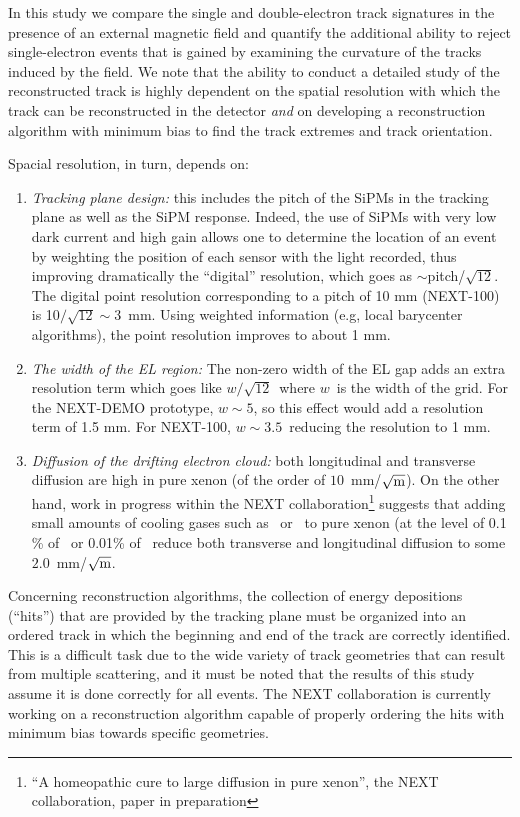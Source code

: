 \documentclass{JINST}
\begin{document}
In this study we compare the single and double-electron track signatures in the presence of an external magnetic field and quantify the additional ability to reject single-electron events that is gained by examining the curvature of the tracks induced by the field.  We note that the ability to conduct a detailed study of the reconstructed track is highly dependent on the spatial resolution with which the track can be reconstructed in the detector {\em and} on developing a reconstruction algorithm with minimum bias to find the track extremes and track orientation. 

Spacial resolution, in turn, depends on:
\begin{enumerate}
\item {\em Tracking plane design:} this includes the pitch of the SiPMs in the tracking plane as well as the SiPM response. Indeed, the use of SiPMs with very low dark current and high gain allows one to determine the location of an event by weighting the position of each sensor with the light recorded, thus improving dramatically the ``digital'' resolution, which goes as $\sim$pitch/$\sqrt{12}$. The digital point resolution corresponding to a pitch of 10 mm (NEXT-100) is 10$/\sqrt{12} \sim 3$~mm. Using weighted information (e.g, local barycenter algorithms), the point resolution improves to about 1 mm. 
\item {\em The width of the EL region:}
The non-zero width of the EL gap adds an extra resolution term which goes like $w/\sqrt{12}$~where $w$~is the width of the grid. For the NEXT-DEMO prototype, $w\sim 5$, so this effect would add a resolution term of 1.5 mm. For NEXT-100, $w\sim 3.5$~reducing the resolution to 1 mm. 

\item {\em Diffusion of the drifting electron cloud:}  both longitudinal and transverse diffusion are high in pure xenon (of the order of $10$~mm/$\sqrt{\rm{m}}$). On the other hand, work in progress within the NEXT collaboration\footnote{``A homeopathic cure to large diffusion in pure xenon'', the NEXT collaboration, paper in preparation} suggests that adding small amounts of cooling gases such as \CHF\ or \CFF\ to pure xenon (at the level of 0.1 \% of \CHF\ or 0.01\% of \CFF\ reduce both transverse and longitudinal diffusion to some $2.0$~mm/$\sqrt{\rm{m}}$.
\end{enumerate}

Concerning reconstruction algorithms, the collection of energy depositions (``hits'') that are provided by the tracking plane must be organized into an ordered track in which the beginning and end of the track are correctly identified.  This is a difficult task due to the wide variety of track geometries that can result from multiple scattering, and it must be noted that the results of this study assume it is done correctly for all events.  The NEXT collaboration is currently working on a reconstruction algorithm capable of properly ordering the hits with minimum bias towards specific geometries. 
\end{document}
